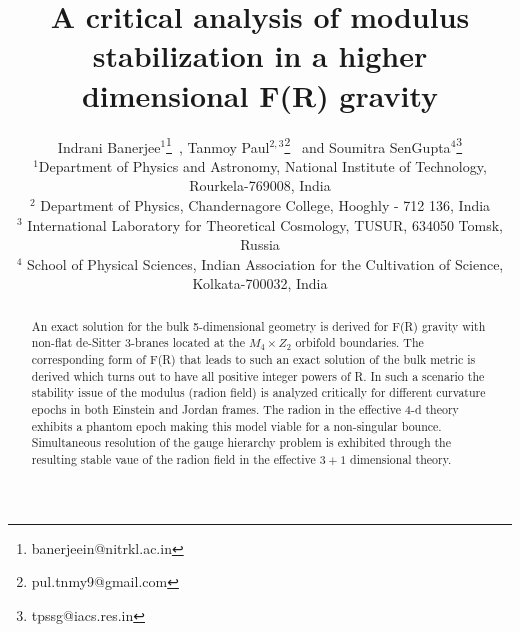 \documentclass{article}
\title{A critical analysis of modulus stabilization in a higher dimensional F(R) gravity}
\author{Indrani Banerjee$^{1}$\footnote{banerjeein@nitrkl.ac.in}~,
Tanmoy Paul$^{2,3}$\footnote{pul.tnmy9@gmail.com}~
and Soumitra SenGupta$^{4}$\footnote{tpssg@iacs.res.in} \\
\small{$^{1}$Department of Physics and Astronomy, National Institute of Technology, Rourkela-769008, India }\\
\small{$^{2}$ Department of Physics, Chandernagore College, Hooghly - 712 136, India}\\
\small{$^{3}$ International Laboratory for Theoretical Cosmology, TUSUR, 634050 Tomsk, Russia}\\
\small{$^{4}$ School of Physical Sciences, Indian Association for the Cultivation of Science, Kolkata-700032, India}}
\date{}
\begin{document}
\maketitle


\begin{abstract}
An exact solution for the bulk 5-dimensional geometry is derived for F(R) gravity with 
non-flat de-Sitter 3-branes located at the $M_4 \times Z_2$ orbifold boundaries. The corresponding form of F(R) that leads to such an exact solution of the bulk metric is derived which turns out to have all positive integer powers of R.
In such a scenario the stability issue of the modulus (radion field) is analyzed critically for different curvature epochs in both Einstein and Jordan frames. The radion in the effective 4-d theory exhibits a phantom epoch making this model viable for a non-singular bounce. Simultaneous resolution of the gauge hierarchy problem is exhibited through the resulting stable vaue of the radion field in the effective $3+1$ dimensional theory.

\end{abstract}



\end{document}
